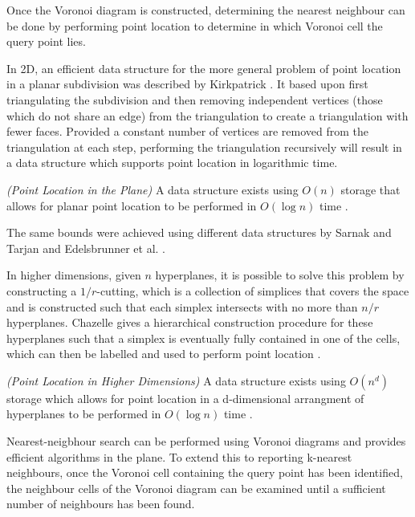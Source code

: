 \documentclass[mcs]{scsthesis}
\begin{document}
Once the Voronoi diagram is constructed, determining the nearest neighbour can
be done by performing point location to determine in which Voronoi cell the
query point lies.

In 2D, an efficient data structure for the more general problem of point
location in a planar subdivision was described by Kirkpatrick
\cite{kirkpatrick}. It based upon first triangulating the subdivision and then
removing independent vertices (those which do not share an edge) from the
triangulation to create a triangulation with fewer faces. Provided a constant
number of vertices are removed from the triangulation at each step, performing
the triangulation recursively will result in a data structure which supports
point location in logarithmic time.

\begin{thm} \emph{(Point Location in the Plane)}
A data structure exists using \(O(n)\) storage that allows for planar
point location to be performed in \(O(\log n)\) time \cite{kirkpatrick}.
\end{thm}

The same bounds were achieved using different data structures by Sarnak and
Tarjan \cite{sarnak} and Edelsbrunner et al. \cite{edelsbrunner}.

In higher dimensions, given $n$ hyperplanes, it is possible to solve this problem
by constructing a \(1/r\)-cutting, which is a collection of simplices that
covers the space and is constructed such that each simplex intersects with no
more than \(n/r\) hyperplanes. Chazelle gives a hierarchical construction
procedure for these hyperplanes such that a simplex is eventually fully
contained in one of the cells, which can then be labelled and used to perform
point location \cite{chazelle}.

\begin{thm} \emph{(Point Location in Higher Dimensions)}
A data structure exists using \(O(n^d)\) storage which allows for  
point location in a d-dimensional arrangment of hyperplanes to be performed in
\(O(\log n)\) time \cite{chazelle}.
\end{thm}

Nearest-neigbhour search can be performed using Voronoi diagrams and provides
efficient algorithms in the plane. To extend this to reporting k-nearest
neighbours, once the Voronoi cell containing the query point has been
identified, the neighbour cells of the Voronoi diagram can be examined until
a sufficient number of neighbours has been found. 
\end{document}
